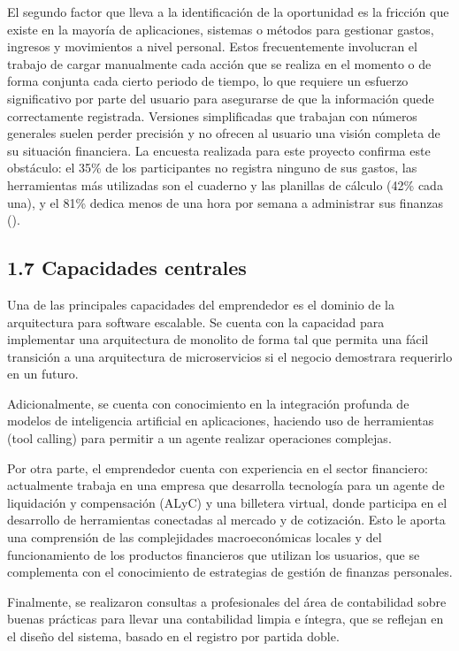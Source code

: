 El segundo factor que lleva a la identificación de la oportunidad es la
fricción que existe en la mayoría de aplicaciones, sistemas o métodos
para gestionar gastos, ingresos y movimientos a nivel personal. Estos
frecuentemente involucran el trabajo de cargar manualmente cada acción
que se realiza en el momento o de forma conjunta cada cierto periodo de
tiempo, lo que requiere un esfuerzo significativo por parte del usuario
para asegurarse de que la información quede correctamente registrada.
Versiones simplificadas que trabajan con números generales suelen perder
precisión y no ofrecen al usuario una visión completa de su situación
financiera. La encuesta realizada para este proyecto confirma este
obstáculo: el 35\% de los participantes no registra ninguno de sus
gastos, las herramientas más utilizadas son el cuaderno y las planillas
de cálculo (42\% cada una), y el 81\% dedica menos de una hora por
semana a administrar sus finanzas
().

\subsection*{1.7 Capacidades centrales}\label{capacidades-centrales}

Una de las principales capacidades del emprendedor es el dominio de la
arquitectura para software escalable. Se cuenta con la capacidad para
implementar una arquitectura de monolito de forma tal que permita una
fácil transición a una arquitectura de microservicios si el negocio
demostrara requerirlo en un futuro.

Adicionalmente, se cuenta con conocimiento en la integración profunda de
modelos de inteligencia artificial en aplicaciones, haciendo uso de
herramientas (tool calling) para permitir a un agente realizar
operaciones complejas.

Por otra parte, el emprendedor cuenta con experiencia en el sector
financiero: actualmente trabaja en una empresa que desarrolla tecnología
para un agente de liquidación y compensación (ALyC) y una billetera
virtual, donde participa en el desarrollo de herramientas conectadas al
mercado y de cotización. Esto le aporta una comprensión de las
complejidades macroeconómicas locales y del funcionamiento de los
productos financieros que utilizan los usuarios, que se complementa con
el conocimiento de estrategias de gestión de finanzas personales.

Finalmente, se realizaron consultas a profesionales del área de
contabilidad sobre buenas prácticas para llevar una contabilidad limpia
e íntegra, que se reflejan en el diseño del sistema, basado en el
registro por partida doble.

